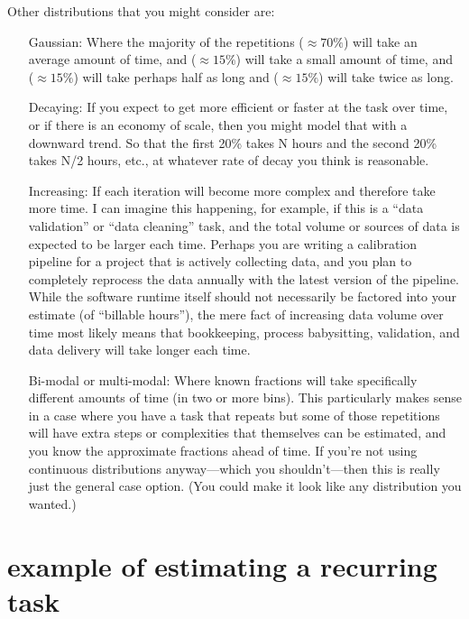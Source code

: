 \documentclass[12pt,oneside]{book}
\begin{document}
Other distributions that you might consider are:
\begin{itemize}[wide, labelwidth=!, labelindent=0pt, font=\bfseries]
\item[Gaussian:] Where the majority of the repetitions ($\approx{70}\%$) will take an average amount of time, and ($\approx{15}\%$) will take a small amount of time, and ($\approx{15}\%$) will take perhaps half as long and ($\approx{15}\%$) will take twice as long.
\item[Decaying:] If you expect to get more efficient or faster at the task over time, or if there is an economy of scale, then you might model that with a downward trend. So that the first 20\% takes N hours and the second 20\% takes N/2 hours, etc., at whatever rate of decay you think is reasonable.
\item[Increasing:] If each iteration will become more complex and therefore take more time. I can imagine this happening, for example, if this is a ``data validation'' or ``data cleaning'' task, and the total volume or sources of data is expected to be larger each time. Perhaps you are writing a calibration pipeline for a project that is actively collecting data, and you plan to completely reprocess the data annually with the latest version of the pipeline. While the software runtime itself should not necessarily be factored into your estimate (of ``billable hours''), the mere fact of increasing data volume over time most likely means that bookkeeping, process babysitting, validation, and data delivery will take longer each time.
\item[Bi-modal or multi-modal:] Where known fractions will take specifically different amounts of time (in two or more bins). This particularly makes sense in a case where you have a task that repeats but some of those repetitions will have extra steps or complexities that themselves can be estimated, and you know the approximate fractions ahead of time. If you're not using continuous distributions anyway---which you shouldn't---then this is really just the general case option. (You could make it look like any distribution you wanted.)
\end{itemize}

\section*{example of estimating a recurring task}
\end{document}
